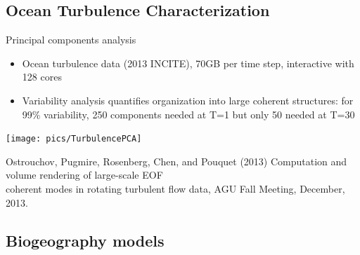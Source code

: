 \subsection{Ocean Turbulence Characterization}
\begin{frame}
  \begin{block}{Principal components analysis}
    \begin{itemize}\scriptsize
    \item Ocean turbulence data (2013 INCITE), 70GB per time step,
      interactive with 128 cores
    \item Variability analysis quantifies organization into large
      coherent structures: for 99\% variability, 250 components needed at T=1
      but only 50 needed at T=30
    \end{itemize}
    \vspace{-3ex}
    \begin{center}
      \texttt{[image: pics/TurbulencePCA]}
    \end{center}
  \end{block}
  \begin{raggedright}\tiny
    Ostrouchov, Pugmire, Rosenberg, Chen, and Pouquet (2013)
    Computation and volume rendering of large-scale EOF \\[-2ex] coherent modes
    in rotating turbulent flow data, AGU Fall Meeting, December, 2013.
  \end{raggedright}
\end{frame}

\subsection{Biogeography models}

